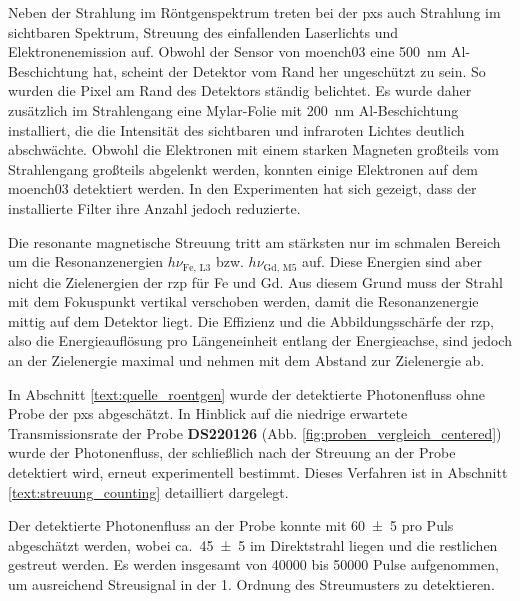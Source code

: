 \noindent
Neben der Strahlung im Röntgenspektrum treten bei der \gls{pxs} auch Strahlung im sichtbaren Spektrum, Streuung des einfallenden Laserlichts und Elektronenemission auf. Obwohl der Sensor von \gls{moench03} eine \SI{500}{\nano\meter} Al-Beschichtung hat, scheint der Detektor vom Rand her ungeschützt zu sein. So wurden die Pixel am Rand des Detektors ständig belichtet. Es wurde daher zusätzlich im Strahlengang eine Mylar-Folie mit \SI{200}{\nano\meter} Al-Beschichtung installiert, die die Intensität des sichtbaren und infraroten Lichtes deutlich abschwächte. Obwohl die Elektronen mit einem starken Magneten großteils vom Strahlengang großteils abgelenkt werden, konnten einige Elektronen auf dem \gls{moench03} detektiert werden. In den Experimenten hat sich gezeigt, dass der installierte Filter ihre Anzahl jedoch reduzierte.
%

\noindent
Die resonante magnetische Streuung tritt am stärksten nur im schmalen Bereich um die Resonanzenergien $h\nu_{\text{Fe, L3}}$ bzw. $h\nu_{\text{Gd, M5}}$ auf. Diese Energien sind aber nicht die Zielenergien der \gls{rzp} für Fe und Gd. Aus diesem Grund muss der Strahl mit dem Fokuspunkt vertikal verschoben werden, damit die Resonanzenergie mittig auf dem Detektor liegt. Die Effizienz und die Abbildungsschärfe der \gls{rzp}, also die Energieauflösung pro Längeneinheit entlang der Energieachse, sind jedoch an der Zielenergie maximal und nehmen mit dem Abstand zur Zielenergie ab.

\noindent
In Abschnitt \ref{text:quelle_roentgen} wurde der detektierte Photonenfluss ohne Probe der \gls{pxs} abgeschätzt. In Hinblick auf die niedrige erwartete Transmissionsrate der Probe \textbf{DS220126} (Abb. \ref{fig:proben_vergleich_centered}) wurde der Photonenfluss, der schließlich nach der Streuung an der Probe detektiert wird, erneut experimentell bestimmt. Dieses Verfahren ist in Abschnitt \ref{text:streuung_counting} detailliert dargelegt.

\noindent
Der detektierte Photonenfluss an der Probe konnte mit \SI{60(5)}{\photons} pro Puls abgeschätzt werden, wobei ca.\ \SI{45(5)}{\photons} im Direktstrahl liegen und die restlichen gestreut werden. Es werden insgesamt von \num{40000} bis \SI{50000}{\captures} Pulse aufgenommen, um ausreichend Streusignal in der 1. Ordnung des Streumusters zu detektieren.